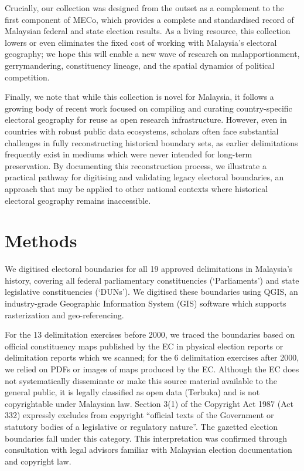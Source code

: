 \documentclass[11pt]{article}
\begin{document}
Crucially, our collection was designed from the outset as a complement to the first component of MECo,\cite{thevesh2025meco} which provides a complete and standardised record of Malaysian federal and state election results. As a living resource, this collection lowers or even eliminates the fixed cost of working with Malaysia's electoral geography; we hope this will enable a new wave of research on malapportionment, gerrymandering, constituency lineage, and the spatial dynamics of political competition.

Finally, we note that while this collection is novel for Malaysia, it follows a growing body of recent work\cite{taylor2023canada, lewis2013us} focused on compiling and curating country-specific electoral geography for reuse as open research infrastructure. However, even in countries with robust public data ecosystems, scholars often face substantial challenges in fully reconstructing historical boundary sets, as earlier delimitations frequently exist in mediums which were never intended for long-term preservation. By documenting this reconstruction process, we illustrate a practical pathway for digitising and validating legacy electoral boundaries, an approach that may be applied to other national contexts where historical electoral geography remains inaccessible.

\section*{Methods}

We digitised electoral boundaries for all 19 approved delimitations in Malaysia's history, covering all federal parliamentary constituencies (`Parliaments') and state legislative constituencies (`DUNs'). We digitised these boundaries using QGIS, an industry-grade Geographic Information System (GIS) software which supports rasterization and geo-referencing.

For the 13 delimitation exercises before 2000, we traced the boundaries based on official constituency maps published by the EC in physical election reports or delimitation reports which we scanned; for the 6 delimitation exercises after 2000, we relied on PDFs or images of maps produced by the EC. Although the EC does not systematically disseminate or make this source material available to the general public, it is legally classified as open data (Terbuka) and is not copyrightable under Malaysian law. Section 3(1) of the Copyright Act 1987 (Act 332) expressly excludes from copyright ``official texts of the Government or statutory bodies of a legislative or regulatory nature''. The gazetted election boundaries fall under this category. This interpretation was confirmed through consultation with legal advisors familiar with Malaysian election documentation and copyright law.
\end{document}
